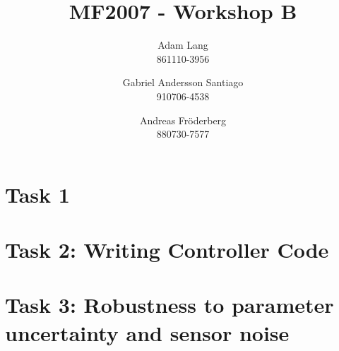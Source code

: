 \documentclass[12pt,a4paper]{article}
\title{MF2007 - Workshop B}
\author{
Adam Lang \\ 861110-3956
\and
Gabriel Andersson Santiago \\ 910706-4538
\and 
Andreas Fr\"oderberg \\ 880730-7577
}
\begin{document}
\maketitle
\section*{Task 1}
  
\section*{Task 2: Writing Controller Code}
  
\section*{Task 3: Robustness to parameter uncertainty and sensor noise}
  
  
\end{document}
